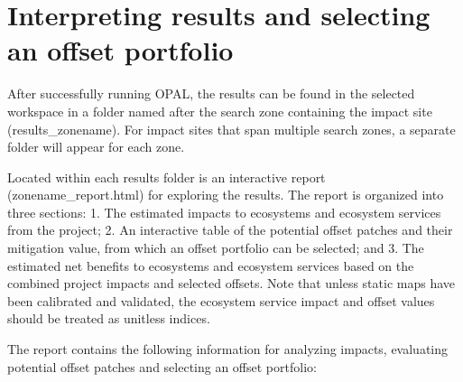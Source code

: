 \documentclass[11pt,letterpaper]{report}
\begin{document}
\chapter{Interpreting results and selecting an offset portfolio}

	After successfully running OPAL, the results can be found in the selected workspace in a folder named after the search zone containing the impact site (results\_{}zonename). For impact sites that span multiple search zones, a separate folder will appear for each zone.  
	
	Located within each results folder is an interactive report (zonename\_{}report.html) for exploring the results. The report is organized into three sections: 1. The estimated impacts to ecosystems and ecosystem services from the project; 2. An interactive table of the potential offset patches and their mitigation value, from which an offset portfolio can be selected; and 3. The estimated net benefits to ecosystems and ecosystem services based on the combined project impacts and selected offsets. Note that unless static maps have been calibrated and validated, the ecosystem service impact and offset values should be treated as unitless indices.
	
	The report contains the following information for analyzing impacts, evaluating potential offset patches and selecting an offset portfolio:
	
\end{document}

